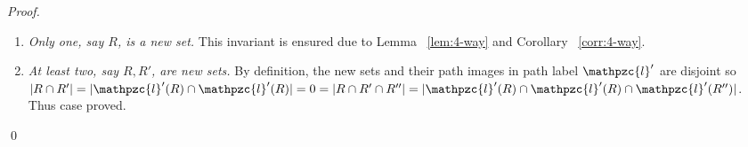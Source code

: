 \documentclass[envcountsect, envcountsame, 11pt]{../lib/llncs2e/llncs}
\def\cF{{\cal F}}
\def\cl{\mathpzc{l}}
\def\assign{\leftarrow}
\begin{document}
\begin{proof}
\begin{enumerate}[\textreferencemark]
\begin{enumerate}[{\bf a.}]
  \item {\em Only one, say $R$, is a new set.} This invariant is ensured due to Lemma ~\ref{lem:4-way} and Corollary ~\ref{corr:4-way}.
  \item {\em At least two, say $R, R'$, are new sets.} By definition, the new
      sets and their path images in path label $\cl'$ are disjoint so
      $|R \cap R'| = |\cl'(R) \cap \cl'(R)| = 0 = |R \cap R' \cap R''| =  |\cl'(R) \cap \cl'(R) \cap \cl'(R'')|$. Thus case proved.  
      \end{enumerate}
    \end{enumerate} \qed
\end{proof}
%
\end{document}

